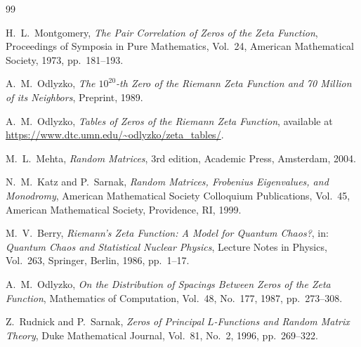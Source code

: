 \documentclass[11pt]{amsart}
\theoremstyle{definition}
\theoremstyle{remark}
\begin{document}
\begin{thebibliography}{99}

H.~L.~Montgomery,
\emph{The Pair Correlation of Zeros of the Zeta Function},
Proceedings of Symposia in Pure Mathematics,
Vol.~24,
American Mathematical Society,
1973,
pp.~181--193.

A.~M.~Odlyzko,
\emph{The $10^{20}$-th Zero of the Riemann Zeta Function and 70 Million of its Neighbors},
Preprint,
1989.

A.~M.~Odlyzko,
\emph{Tables of Zeros of the Riemann Zeta Function},
available at
\url{https://www.dtc.umn.edu/~odlyzko/zeta_tables/}.

M.~L.~Mehta,
\emph{Random Matrices},
3rd edition,
Academic Press,
Amsterdam,
2004.

N.~M.~Katz and P.~Sarnak,
\emph{Random Matrices, Frobenius Eigenvalues, and Monodromy},
American Mathematical Society Colloquium Publications,
Vol.~45,
American Mathematical Society,
Providence, RI,
1999.

M.~V.~Berry,
\emph{Riemann's Zeta Function: A Model for Quantum Chaos?},
in:
\emph{Quantum Chaos and Statistical Nuclear Physics},
Lecture Notes in Physics,
Vol.~263,
Springer,
Berlin,
1986,
pp.~1--17.

A.~M.~Odlyzko,
\emph{On the Distribution of Spacings Between Zeros of the Zeta Function},
Mathematics of Computation,
Vol.~48,
No.~177,
1987,
pp.~273--308.

Z.~Rudnick and P.~Sarnak,
\emph{Zeros of Principal $L$-Functions and Random Matrix Theory},
Duke Mathematical Journal,
Vol.~81,
No.~2,
1996,
pp.~269--322.

\end{thebibliography}
\end{document}
